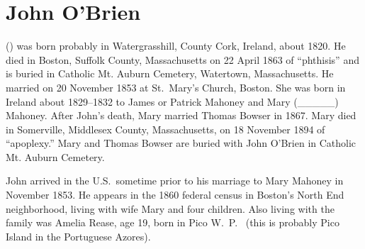 \section{John O'Brien}\label{per:John2OBrien}

 () was born probably in Watergrasshill, County Cork, Ireland, about 1820.\cite{John2OBrienMarriage:2} He died in Boston, Suffolk County, Massachusetts on 22 April 1863 of ``phthisis'' \cite{John2OBrienDeath:2} and is buried in Catholic Mt. Auburn Cemetery, Watertown, Massachusetts.\cite{BillMcEvoy:1} He married  on 20 November 1853 at St.\ Mary's Church, Boston.\cite{John2OBrienMarriage:3} She was born in Ireland about 1829--1832 to James or Patrick Mahoney and Mary (\_\_\_\_\_) Mahoney.\cite{John2OBrienCivilMarriage:2,MaryMahoneyBowserMarriage:1} After John's death, Mary married Thomas Bowser in 1867.\cite{MaryMahoneyBowserMarriage:2} Mary died in Somerville, Middlesex County, Massachusetts, on 18 November 1894 of ``apoplexy.''\cite{MaryMahoneyDeath} Mary and Thomas Bowser are buried with John O'Brien in Catholic Mt. Auburn Cemetery.\cite{BillMcEvoy:2}

John arrived in the U.S.\ sometime prior to his marriage to Mary Mahoney in November 1853. He appears in the 1860 federal census in Boston's North End neighborhood, living with wife Mary and four children. Also living with the family was Amelia Rease, age 19, born in Pico W.\ P.\ \cite{Census1860John} (this is probably Pico Island in the Portuguese Azores). 

